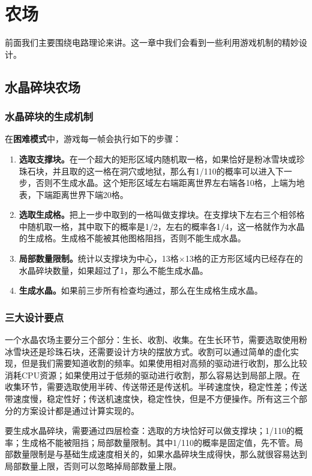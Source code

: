 \chapter{农场}

前面我们主要围绕电路理论来讲。这一章中我们会看到一些利用游戏机制的精妙设计。

\section{水晶碎块农场}
\subsection{水晶碎块的生成机制}
在\textbf{困难模式}中，游戏每一帧会执行如下的步骤：
\begin{enumerate}
    \item \textbf{选取支撑块。}在一个超大的矩形区域内随机取一格，如果恰好是粉冰雪块或珍珠石块，并且取的这一格在洞穴或地狱，那么有1/110的概率可以进入下一步，否则不生成水晶。这个矩形区域左右端距离世界左右端各10格，上端为地表，下端距离世界下端20格。
    \item \textbf{选取生成格。}把上一步中取到的一格叫做支撑块。在支撑块下左右三个相邻格中随机取一格，其中取下的概率是1/2，左右的概率各1/4，这一格就作为水晶的生成格。生成格不能被其他图格阻挡，否则不能生成水晶。
    \item \textbf{局部数量限制。}统计以支撑块为中心，13格$\times$13格的正方形区域内已经存在的水晶碎块数量，如果超过了1，那么不能生成水晶。
    \item \textbf{生成水晶。}如果前三步所有检查均通过，那么在生成格生成水晶。
\end{enumerate}

\subsection{三大设计要点}
一个水晶农场主要分三个部分：生长、收割、收集。在生长环节，需要选取使用粉冰雪块还是珍珠石块，还需要设计方块的摆放方式。收割可以通过简单的虚化实现，但是我们需要知道收割的频率。如果使用相对高频的驱动进行收割，那么比较消耗CPU资源；如果使用过于低频的驱动进行收割，那么容易达到局部上限。在收集环节，需要选取使用半砖、传送带还是传送机。半砖速度快，稳定性差；传送带速度慢，稳定性好；传送机速度快，稳定性快，但是不方便操作。所有这三个部分的方案设计都是通过计算实现的。

要生成水晶碎块，需要通过四层检查：选取的方块恰好可以做支撑块；1/110的概率；生成格不能被阻挡；局部数量限制。其中1/110的概率是固定值，先不管。局部数量限制是与基础生成速度相关的，如果水晶碎块生成得快，那么就很容易达到局部数量上限，否则可以忽略掉局部数量上限。

